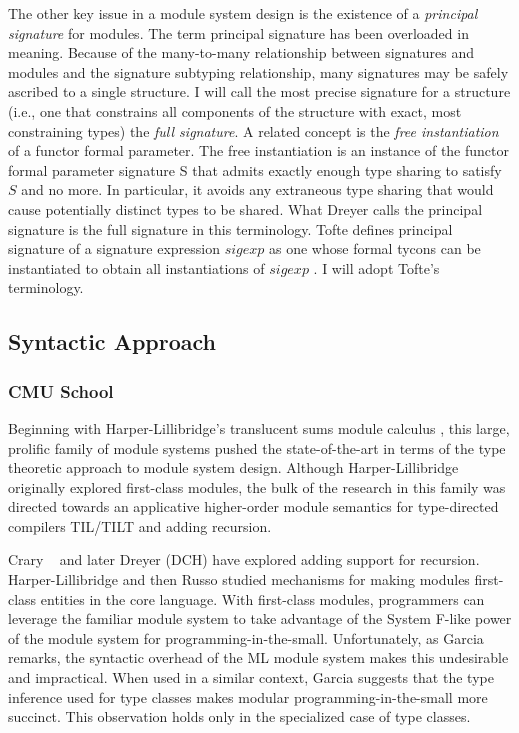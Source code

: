 The other key issue in a module system design is the existence of a \emph{principal signature} for modules. The term principal signature has been overloaded in meaning. Because of the many-to-many relationship between signatures and modules and the signature subtyping relationship, many signatures may be safely ascribed to a single structure. I will call the most precise signature for a structure (i.e., one that constrains all components of the structure with exact, most constraining types) the \emph{full signature}. A related concept is the \emph{free instantiation} of a functor formal parameter. The free instantiation is an instance of the functor formal parameter signature S that admits exactly enough type sharing to satisfy $S$ and no more. In particular, it avoids any extraneous type sharing that would cause potentially distinct types to be shared. What Dreyer \cite{dreyerthesis} calls the principal signature is the full signature in this terminology. Tofte defines principal signature of a signature expression $sigexp$ as one whose formal tycons can be instantiated to obtain all instantiations of $sigexp$ \cite{tofte92,mthm97}. I will adopt Tofte's terminology. 
   
\subsection{Syntactic Approach}
\subsubsection{CMU School}
Beginning with Harper-Lillibridge's translucent sums module calculus \cite{lillibridge94}, this large, prolific family of module systems pushed the state-of-the-art in terms of the type theoretic approach to module system design. Although Harper-Lillibridge originally explored first-class modules, the bulk of the research in this family was directed towards an applicative higher-order module semantics for type-directed compilers TIL/TILT and adding recursion. 

Crary \etal~\cite{crary99} and later Dreyer \cite{dreyer04,dreyer07} (DCH)
have explored adding support for recursion. Harper-Lillibridge
\cite{lillibridge94} and then Russo \cite{russo00} studied mechanisms
for making modules first-class entities in the core language. With
first-class modules, programmers can leverage the familiar module
system to take advantage of the System F-like power of the module
system for programming-in-the-small. Unfortunately, as Garcia
\cite{garcia05:extendedcomparing05} remarks, the syntactic overhead of
the ML module system makes this undesirable and impractical. When used
in a similar context, Garcia suggests that the type inference used for
type classes makes modular programming-in-the-small more
succinct. This observation holds only in the specialized case of type
classes. 


